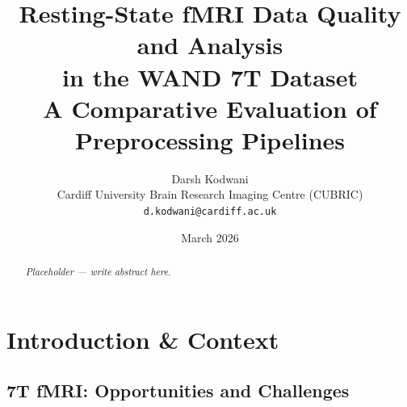 \documentclass[11pt, a4paper]{article}
\title{
    \textbf{Resting-State fMRI Data Quality and Analysis\\
    in the WAND 7T Dataset}\\[0.5em]
    \large A Comparative Evaluation of Preprocessing Pipelines
}
\author{
    Darsh Kodwani\\
    \small Cardiff University Brain Research Imaging Centre (CUBRIC)\\
    \small \texttt{d.kodwani@cardiff.ac.uk}
}
\date{March 2026}
\begin{document}

\maketitle
\thispagestyle{fancy}
\tableofcontents
\newpage

\begin{abstract}

%

\noindent
\textit{Placeholder --- write abstract here.}

\end{abstract}

\newpage

\section{Introduction \& Context}
\label{sec:intro}

%

\subsection{7T fMRI: Opportunities and Challenges}
\end{document}
